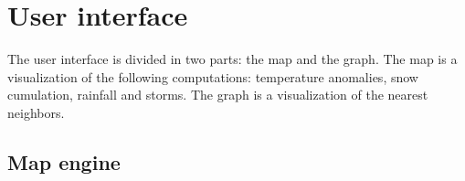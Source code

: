 \section{User interface}
The user interface is divided in two parts: the map and the graph. The map is a visualization of the following computations: temperature anomalies, snow cumulation, rainfall and storms. The graph is a visualization of the nearest neighbors.
\subsection{Map engine}

\subsection{}
